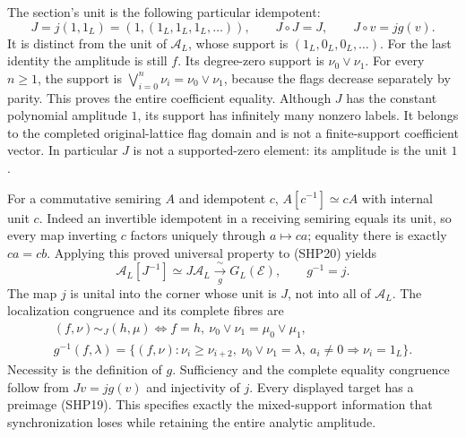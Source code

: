 The section's unit is the following particular idempotent:
\begin{equation}\tag{SHP20}
 J=j(1,1_L)
    =(1,(1_L,1_L,1_L,\ldots)),\qquad
 J\circ J=J,\qquad J\circ v=jg(v).
\end{equation}
It is distinct from the unit of $\mathcal A_L$, whose
support is $(1_L,0_L,0_L,\ldots)$.
For the last identity the amplitude is still $f$.
Its degree-zero support is $\nu_0\vee\nu_1$.
For every $n\ge1$, the support is
$\bigvee_{i=0}^{n}\nu_i=\nu_0\vee\nu_1$,
because the flags decrease separately by parity.
This proves the entire coefficient equality.
Although $J$ has the constant polynomial amplitude $1$,
its support has infinitely many nonzero labels.
It belongs to the completed original-lattice flag
domain and is not a finite-support coefficient vector.
In particular $J$ is not a supported-zero element:
its amplitude is the unit $1$.

For a commutative semiring $A$ and idempotent $c$,
$A[c^{-1}]\simeq cA$ with internal unit $c$.
Indeed an invertible idempotent in a receiving semiring
equals its unit, so every map inverting $c$ factors
uniquely through $a\mapsto ca$; equality there is
exactly $ca=cb$. Applying this proved universal
property to (SHP20) yields
\begin{equation}\tag{SHP21}
 \mathcal A_L[J^{-1}]
       \simeq J\mathcal A_L
       \xrightarrow[\ g\ ]{\ \sim\ }G_L(\mathcal E),
       \qquad g^{-1}=j.
\end{equation}
The map $j$ is unital into the corner whose unit is
$J$, not into all of $\mathcal A_L$.
The localization congruence and its complete fibres are
\begin{equation}\tag{SHP22}
 \begin{gathered}
 (f,\nu)\sim_J(h,\mu)
    \Longleftrightarrow f=h,\
                  \nu_0\vee\nu_1=\mu_0\vee\mu_1,\\
 g^{-1}(f,\lambda)=
 \{(f,\nu):\nu_i\ge\nu_{i+2},\
       \nu_0\vee\nu_1=\lambda,\
       a_i\ne0\Rightarrow\nu_i=1_L\}.
 \end{gathered}
\end{equation}
Necessity is the definition of $g$.
Sufficiency and the complete equality congruence follow
from $Jv=jg(v)$ and injectivity of $j$.
Every displayed target has a preimage (SHP19).
This specifies exactly the mixed-support information
that synchronization loses while retaining the entire
analytic amplitude.

